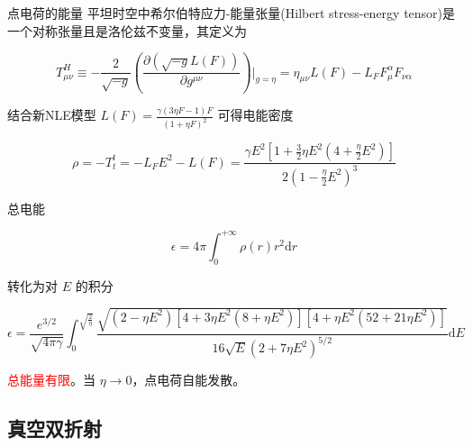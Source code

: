 \documentclass[9pt, dvipsnames]{beamer} %
\begin{document}
\begin{frame}{点电荷的能量}
    平坦时空中希尔伯特应力-能量张量(Hilbert stress-energy tensor)是一个对称张量且是洛伦兹不变量，其定义为

    $$
    T_{\mu\nu}^H
    \equiv -\frac{2 }{\sqrt{-g} } \left(\frac{\partial \left(\sqrt{-g}L(F) \right) }{\partial g^{\mu\nu} }  \right)\bigg|_{g=\eta}
    =\eta_{\mu\nu}L(F) - L_FF_\mu^\alpha F_{\nu\alpha}
    $$

    结合新NLE模型 $L(F)=\frac{\gamma(3\eta F-1)F }{(1+\eta F)^2 } $ 可得电能密度
    
    $$
    \rho
    =-T_t^t
    =-L_FE^2-L(F)
    =\frac{\gamma E^2\left[1+\frac{3 }{2 } \eta E^2 \left(4+\frac{\eta }{2 } E^2 \right) \right] }{2\left(1-\frac{\eta }{2 } E^2 \right)^3 } 
    $$
    
    总电能
    
    $$
    \epsilon
    =4\pi\int_{0}^{+\infty} \rho(r)r^2\mathrm{d}r
    $$ 
    
    转化为对 $E $ 的积分
    
    $$
    \epsilon
    =\frac{e^{3/2} }{\sqrt{4\pi\gamma} } \int_{0}^{\sqrt{\frac{2 }{\eta  } }} \frac{\sqrt{\left(2-\eta E^2 \right)\left[4+3\eta E^2\left(8+\eta E^2 \right) \right]\left[4+\eta E^2\left(52+21\eta E^2 \right) \right]} }{16\sqrt{E}\left(2+7\eta E^2 \right)^{5/2} } \mathrm{d}E
    $$
    
    \textcolor{red}{总能量有限}。当 $\eta\to 0$，点电荷自能发散。
\end{frame}

\subsection{真空双折射}
\end{document}
